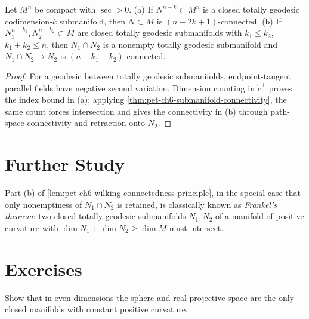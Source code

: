\begin{lemma}
  \label{lem:pet-ch6-wilking-connectedness-principle}


  Let $M^n$ be compact with $\sec>0$. (a) If $N^{n-k}\subset M^n$ is a closed
  totally geodesic codimension-$k$ submanifold, then $N\subset M$ is
  $(n-2k+1)$-connected. (b) If $N_1^{n-k_1},N_2^{n-k_2}\subset M$ are closed
  totally geodesic submanifolds with $k_1\le k_2$, $k_1+k_2\le n$, then
  $N_1\cap N_2$ is a nonempty totally geodesic submanifold and
  $N_1\cap N_2\to N_2$ is $(n-k_1-k_2)$-connected.
\end{lemma}
\begin{proof}
  \sketch
  For a geodesic between totally geodesic submanifolds, endpoint-tangent parallel fields have negative second variation. Dimension counting in \(\dot c^\perp\) proves the index bound in (a); applying \cref{thm:pet-ch6-submanifold-connectivity}, the same count forces intersection and gives the connectivity in (b) through path-space connectivity and retraction onto \(N_2\).
\end{proof}

\section{Further Study}

\begin{remark}
  \label{rem:pet-ch6-frankel-theorem}

  Part (b) of \cref{lem:pet-ch6-wilking-connectedness-principle}, in the
  special case that only nonemptiness of $N_1\cap N_2$ is retained, is
  classically known as \emph{Frankel's theorem}: two closed totally geodesic
  submanifolds $N_1,N_2$ of a manifold of positive curvature with
  $\dim N_1+\dim N_2\ge\dim M$ must intersect.
\end{remark}

\section{Exercises}

\begin{remark}
  \label{rem:pet-ch6-ex-6-7-1}

  Show that in even dimensions the sphere and real projective space are the
  only closed manifolds with constant positive curvature.
\end{remark}


